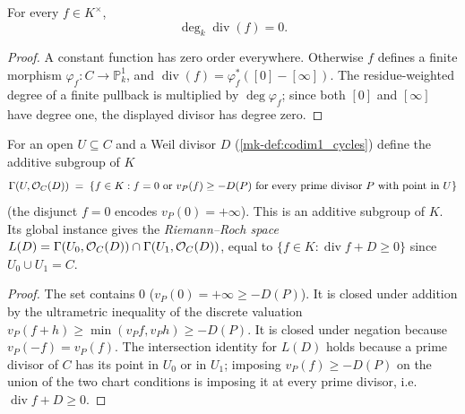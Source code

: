 \begin{theorem}
  \label{mk-thm:adelic_principal_degree_zero}
  For every \(f\in K^\times\),
  \[
    \deg_k\operatorname{div}(f)=0.
  \]
\end{theorem}
\begin{proof}
  A constant function has zero order everywhere.  Otherwise \(f\) defines
  a finite morphism \(\varphi_f\colon C\to\mathbb P^1_k\), and
  \(\operatorname{div}(f)=\varphi_f^*([0]-[\infty])\).  The
  residue-weighted degree of a finite pullback is multiplied by
  \(\deg\varphi_f\); since both \([0]\) and \([\infty]\) have degree one,
  the displayed divisor has degree zero.
\end{proof}

\begin{definition}
  \label{mk-def:adelic_sectionOfDivisor}
  \leanok

  For an open \(U \subseteq C\) and a Weil divisor \(D\)
  (\ref{mk-def:codim1_cycles}) define the additive subgroup of \(K\)
  \[
    \Gamma(U, \mathcal{O}_{C}(D)) \;=\;
      \{ f \in K : f = 0 \text{ or } v_P(f) \ge -D(P) \text{ for every
         prime divisor } P \text{ with point in } U\}
  \]
  (the disjunct \(f = 0\) encodes \(v_P(0) = +\infty\)).  This is an
  additive subgroup of \(K\).  Its global instance gives the
  \emph{Riemann--Roch space}
  \(L(D) = \Gamma(U_0, \mathcal{O}_{C}(D)) \cap \Gamma(U_1, \mathcal{O}_{C}(D))\),
  equal to \(\{ f \in K : \operatorname{div} f + D \ge 0\}\) since
  \(U_0 \cup U_1 = C\).
\end{definition}
\begin{proof}
  \leanok
  The set contains \(0\)
  (\(v_P(0) = +\infty \ge -D(P)\)). It is closed under addition by the
  ultrametric inequality of the discrete valuation
  \(v_P(f + h) \ge \min(v_P f, v_P h) \ge -D(P)\). It is closed under
  negation because \(v_P(-f)=v_P(f)\).
  The intersection identity for \(L(D)\) holds because a prime divisor of
  \(C\) has its point in \(U_0\) or in \(U_1\); imposing \(v_P(f) \ge
  -D(P)\) on the union of the two chart conditions is imposing it at
  every prime divisor, i.e.\ \(\operatorname{div} f + D \ge 0\).
\end{proof}

